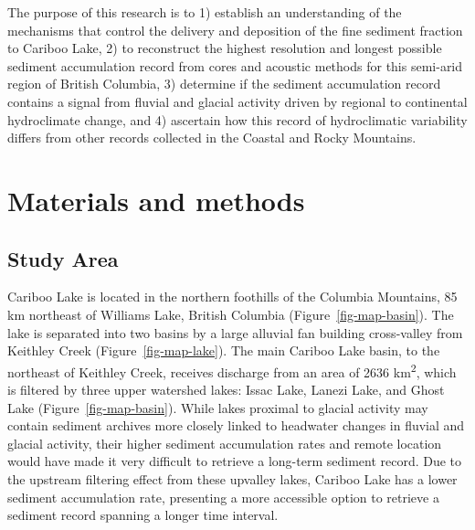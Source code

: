 \documentclass[
  letterpaper,
  DIV=11,
  numbers=noendperiod]{scrartcl}
\begin{document}
The purpose of this research is to 1) establish an understanding of the
mechanisms that control the delivery and deposition of the fine sediment
fraction to Cariboo Lake, 2) to reconstruct the highest resolution and
longest possible sediment accumulation record from cores and acoustic
methods for this semi-arid region of British Columbia, 3) determine if
the sediment accumulation record contains a signal from fluvial and
glacial activity driven by regional to continental hydroclimate change,
and 4) ascertain how this record of hydroclimatic variability differs
from other records collected in the Coastal and Rocky Mountains.

\hypertarget{materials-and-methods}{%
\section{Materials and methods}\label{materials-and-methods}}

\hypertarget{study-area}{%
\subsection{Study Area}\label{study-area}}

Cariboo Lake is located in the northern foothills of the Columbia
Mountains, 85 km northeast of Williams Lake, British Columbia
(Figure~\ref{fig-map-basin}). The lake is separated into two basins by a
large alluvial fan building cross-valley from Keithley Creek
(Figure~\ref{fig-map-lake}). The main Cariboo Lake basin, to the
northeast of Keithley Creek, receives discharge from an area of 2636
km\textsuperscript{2}, which is filtered by three upper watershed lakes:
Issac Lake, Lanezi Lake, and Ghost Lake (Figure~\ref{fig-map-basin}).
While lakes proximal to glacial activity may contain sediment archives
more closely linked to headwater changes in fluvial and glacial
activity, their higher sediment accumulation rates and remote location
would have made it very difficult to retrieve a long-term sediment
record. Due to the upstream filtering effect from these upvalley lakes,
Cariboo Lake has a lower sediment accumulation rate, presenting a more
accessible option to retrieve a sediment record spanning a longer time
interval.
\end{document}
